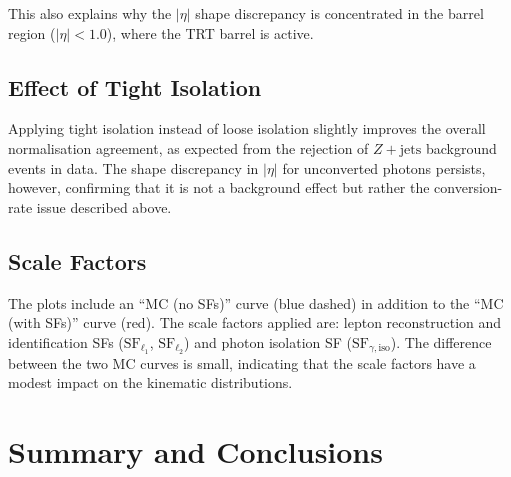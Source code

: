 \documentclass[11pt,a4paper]{article}
\newcommand{\abseta}{\ensuremath{|\eta|}\xspace}
\begin{document}
This also explains why the $\abseta$ shape discrepancy is concentrated
in the barrel region ($|\eta| < 1.0$), where the TRT barrel is active.

\subsection{Effect of Tight Isolation}

Applying tight isolation instead of loose isolation slightly improves the
overall normalisation agreement, as expected from the rejection of
$Z{+}\text{jets}$ background events in data.  The shape discrepancy in
$\abseta$ for unconverted photons persists, however, confirming that it
is not a background effect but rather the conversion-rate issue described
above.

\subsection{Scale Factors}

The plots include an ``MC (no SFs)'' curve (blue dashed) in addition to
the ``MC (with SFs)'' curve (red).  The scale factors applied are:
lepton reconstruction and identification SFs ($\mathrm{SF}_{\ell_1}$,
$\mathrm{SF}_{\ell_2}$) and photon isolation SF ($\mathrm{SF}_{\gamma,\mathrm{iso}}$).
The difference between the two MC curves is small, indicating that the
scale factors have a modest impact on the kinematic distributions.

\section{Summary and Conclusions}
\label{sec:conclusions}
\end{document}
